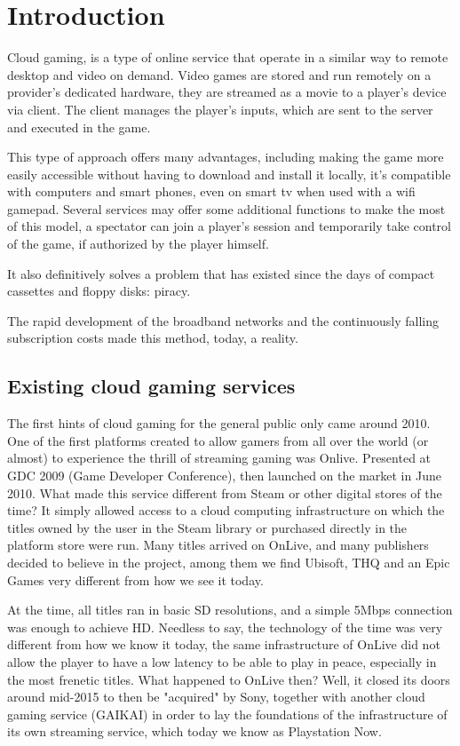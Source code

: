 \chapter{Introduction}
\label{cap:introduction}
Cloud gaming, is a type of online service that operate in a similar way to remote desktop and video on demand. Video games are stored and run remotely on a provider's dedicated hardware, they are streamed as a movie to a player's device via client. The client manages the player's inputs, which are sent to the server and executed in the game.

This type of approach offers many advantages, including making the game more easily accessible without having to download and install it locally, it's compatible with computers and smart phones, even on smart tv when used with a wifi gamepad. Several services may offer some additional functions to make the most of this model, a spectator can join a player's session and temporarily take control of the game, if authorized by the player himself.

It also definitively solves a problem that has existed since the days of compact cassettes and floppy disks: piracy.

The rapid development of the broadband networks and the continuously falling subscription costs made this method, today, a reality.
\section{Existing cloud gaming services}
The first hints of cloud gaming for the general public only came around 2010. One of the first platforms created to allow gamers from all over the world (or almost) to experience the thrill of streaming gaming was Onlive. Presented at GDC 2009 (Game Developer Conference), then launched on the market in June 2010. What made this service different from Steam or other digital stores of the time? It simply allowed access to a cloud computing infrastructure on which the titles owned by the user in the Steam library or purchased directly in the platform store were run. Many titles arrived on OnLive, and many publishers decided to believe in the project, among them we find Ubisoft, THQ and an Epic Games very different from how we see it today.

At the time, all titles ran in basic SD resolutions, and a simple 5Mbps connection was enough to achieve HD. Needless to say, the technology of the time was very different from how we know it today, the same infrastructure of OnLive did not allow the player to have a low latency to be able to play in peace, especially in the most frenetic titles. What happened to OnLive then? Well, it closed its doors around mid-2015 to then be "acquired" by Sony, together with another cloud gaming service (GAIKAI) in order to lay the foundations of the infrastructure of its own streaming service, which today we know as Playstation Now.


